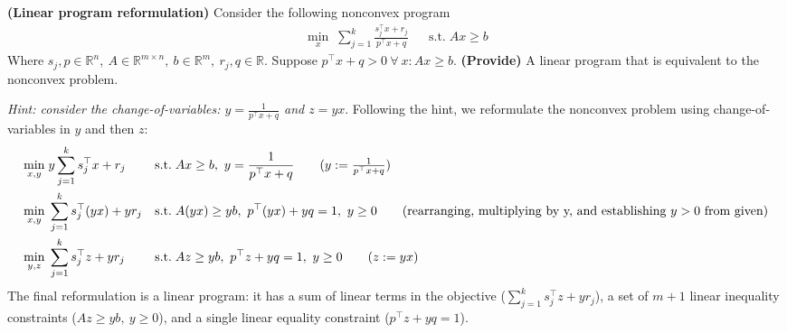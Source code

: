 \documentclass[11pt]{exam}
\begin{document}
\begin{questions}
    \question \textbf{(Linear program reformulation)} Consider the following nonconvex program
    \begin{align*}
        \min_x\; \sum_{j=1}^k \frac{s_j^\top x + r_j}{p^\top x + q} && \text{s.t.}\; Ax \geq b
    \end{align*}
    Where $s_j,p \in \mathbb R^n,\ A\in \mathbb R^{m\times n},\ b\in\mathbb R^m,\ r_j,q\in \mathbb R$. Suppose $p^\top x + q > 0\ \forall\ x:Ax\geq b$. \textbf{(Provide)} A linear program that is equivalent to the nonconvex problem. 
    
    \emph{Hint: consider the change-of-variables: $y = \tfrac{1}{p^\top x + q}$ and $z = yx$}. Following the hint, we reformulate the nonconvex problem using change-of-variables in $y$ and then $z$:
    \begin{align*}
        \min_{x,y}\;& y \sum_{j=1}^k s_j^\top x + r_j && \text{s.t.}\; Ax \geq b,\ y=\frac{1}{p^\top x + q} 
            \tag{$y := \tfrac{1}{p^\top x + q}$}\\
        \min_{x,y}\;& \sum_{j=1}^k s_j^\top (yx) + yr_j && \text{s.t.}\; A(yx) \geq yb,\ p^\top (yx) + yq = 1,\ y\geq 0
            \tag{rearranging, multiplying by y, and establishing $y > 0$ from given}\\
        \min_{y,z}\;& \sum_{j=1}^k s_j^\top z + yr_j && \text{s.t.}\; Az \geq yb,\ p^\top z + yq = 1,\ y\geq 0
            \tag{$z := yx$}
    \end{align*}
    The final reformulation is a linear program: it has a sum of linear terms in the objective ($\sum_{j=1}^k s_j^\top z + yr_j$), a set of $m+1$ linear inequality constraints ($Az \geq yb,\ y\geq 0$), and a single linear equality constraint ($p^\top z + yq = 1$).


    
\end{questions}
\end{document}

